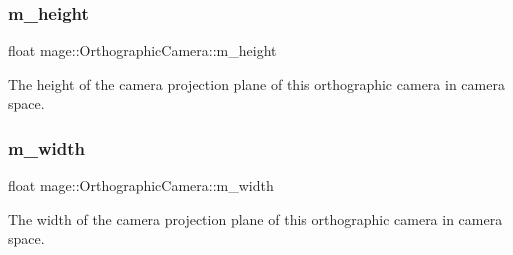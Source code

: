 \subsubsection{\texorpdfstring{m\+\_\+height}{m\_height}}
{\footnotesize\ttfamily float mage\+::\+Orthographic\+Camera\+::m\+\_\+height\hspace{0.3cm}{\ttfamily [private]}}

The height of the camera projection plane of this orthographic camera in camera space. \hypertarget{classmage_1_1_orthographic_camera_aadef4cff19cc1b1ecf427f82bbc3ea6a}{}\label{classmage_1_1_orthographic_camera_aadef4cff19cc1b1ecf427f82bbc3ea6a} 
\subsubsection{\texorpdfstring{m\+\_\+width}{m\_width}}
{\footnotesize\ttfamily float mage\+::\+Orthographic\+Camera\+::m\+\_\+width\hspace{0.3cm}{\ttfamily [private]}}

The width of the camera projection plane of this orthographic camera in camera space. 